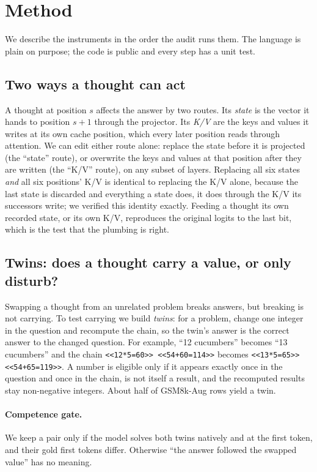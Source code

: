 \documentclass{article}
\begin{document}
\section{Method}\label{sec:method}

We describe the instruments in the order the audit runs them. The language is plain on purpose; the code is public and every step has a unit test.

\subsection{Two ways a thought can act}

A thought at position $s$ affects the answer by two routes. Its \emph{state} is the vector it hands to position $s+1$ through the projector. Its \emph{K/V} are the keys and values it writes at its own cache position, which every later position reads through attention. We can edit either route alone: replace the state before it is projected (the ``state'' route), or overwrite the keys and values at that position after they are written (the ``K/V'' route), on any subset of layers. Replacing all six states \emph{and} all six positions' K/V is identical to replacing the K/V alone, because the last state is discarded and everything a state does, it does through the K/V its successors write; we verified this identity exactly. Feeding a thought its own recorded state, or its own K/V, reproduces the original logits to the last bit, which is the test that the plumbing is right.

\subsection{Twins: does a thought carry a value, or only disturb?}\label{sec:twins}

Swapping a thought from an unrelated problem breaks answers, but breaking is not carrying. To test carrying we build \emph{twins}: for a problem, change one integer in the question and recompute the chain, so the twin's answer is the correct answer to the changed question. For example, ``12 cucumbers'' becomes ``13 cucumbers'' and the chain \texttt{<<12*5=60>> <<54+60=114>>} becomes \texttt{<<13*5=65>> <<54+65=119>>}. A number is eligible only if it appears exactly once in the question and once in the chain, is not itself a result, and the recomputed results stay non-negative integers. About half of GSM8k-Aug rows yield a twin.

\paragraph{Competence gate.} We keep a pair only if the model solves both twins natively and at the first token, and their gold first tokens differ. Otherwise ``the answer followed the swapped value'' has no meaning.
\end{document}
